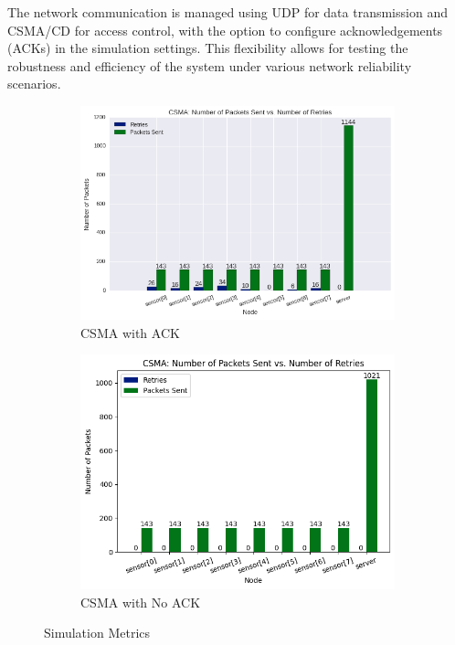\documentclass[12pt]{article}
\begin{document}
The network communication is managed using UDP for data transmission and CSMA/CD for access control, with the option to configure acknowledgements (ACKs) in the simulation settings. This flexibility allows for testing the robustness and efficiency of the system under various network reliability scenarios.

\begin{figure}[ht!]
  \centering
  \begin{subfigure}[b]{0.45\textwidth}  %
    \includegraphics[width=\textwidth]{images/ack.png}
    \caption{CSMA with ACK}
    \label{fig:ack}
  \end{subfigure}
  \hfill  %
  \begin{subfigure}[b]{0.45\textwidth}
    \includegraphics[width=\textwidth]{images/noack.png}
    \caption{CSMA with No ACK}
    \label{fig:noack}
  \end{subfigure}
  \caption{Simulation Metrics}
  \label{fig:analysis}
\end{figure}
\end{document}
